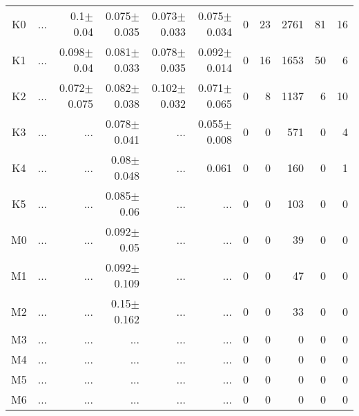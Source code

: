 \begin{table}[t]
\begin{center}
\begin{tabular}{c|rrrrr|rrrrr}
K0	&	 ...	&	0.1$\pm$0.04	&	0.075$\pm$0.035	&	0.073$\pm$0.033	&	0.075$\pm$0.034	&	0	&	23	&	2761	&	81	&	16	\\
K1	&	 ...	&	0.098$\pm$0.04	&	0.081$\pm$0.033	&	0.078$\pm$0.035	&	0.092$\pm$0.014	&	0	&	16	&	1653	&	50	&	6	\\
K2	&	 ...	&	0.072$\pm$0.075	&	0.082$\pm$0.038	&	0.102$\pm$0.032	&	0.071$\pm$0.065	&	0	&	8	&	1137	&	6	&	10	\\
K3	&	 ...	&	 ...	&	0.078$\pm$0.041	&	 ...	&	0.055$\pm$0.008	&	0	&	0	&	571	&	0	&	4	\\
K4	&	 ...	&	 ...	&	0.08$\pm$0.048	&	 ...	&	0.061	&	0	&	0	&	160	&	0	&	1	\\
K5	&	 ...	&	 ...	&	0.085$\pm$0.06	&	 ...	&	 ...	&	0	&	0	&	103	&	0	&	0	\\
M0	&	 ...	&	 ...	&	0.092$\pm$0.05	&	 ...	&	 ...	&	0	&	0	&	39	&	0	&	0	\\
M1	&	 ...	&	 ...	&	0.092$\pm$0.109	&	 ...	&	 ...	&	0	&	0	&	47	&	0	&	0	\\
M2	&	 ...	&	 ...	&	0.15$\pm$0.162	&	 ...	&	 ...	&	0	&	0	&	33	&	0	&	0	\\
M3	&	 ...	&	 ...	&	 ...	&	 ...	&	 ...	&	0	&	0	&	0	&	0	&	0	\\
M4	&	 ...	&	 ...	&	 ...	&	 ...	&	 ...	&	0	&	0	&	0	&	0	&	0	\\
M5	&	 ...	&	 ...	&	 ...	&	 ...	&	 ...	&	0	&	0	&	0	&	0	&	0	\\
M6	&	 ...	&	 ...	&	 ...	&	 ...	&	 ...	&	0	&	0	&	0	&	0	&	0	\\
    \bottomrule
    \end{tabular}
\end{center}
\end{table}


